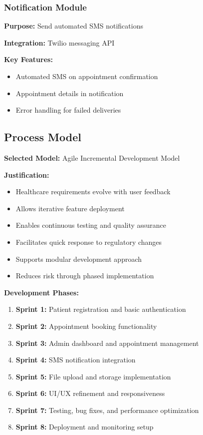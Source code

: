 \documentclass[11pt,a4paper]{article}
\begin{document}
\subsubsection{Notification Module}
\textbf{Purpose:} Send automated SMS notifications

\textbf{Integration:} Twilio messaging API

\textbf{Key Features:}
\begin{itemize}
    \item Automated SMS on appointment confirmation
    \item Appointment details in notification
    \item Error handling for failed deliveries
\end{itemize}

\subsection{Process Model}

\textbf{Selected Model:} Agile Incremental Development Model

\textbf{Justification:}
\begin{itemize}
    \item Healthcare requirements evolve with user feedback
    \item Allows iterative feature deployment
    \item Enables continuous testing and quality assurance
    \item Facilitates quick response to regulatory changes
    \item Supports modular development approach
    \item Reduces risk through phased implementation
\end{itemize}

\textbf{Development Phases:}
\begin{enumerate}
    \item \textbf{Sprint 1:} Patient registration and basic authentication
    \item \textbf{Sprint 2:} Appointment booking functionality
    \item \textbf{Sprint 3:} Admin dashboard and appointment management
    \item \textbf{Sprint 4:} SMS notification integration
    \item \textbf{Sprint 5:} File upload and storage implementation
    \item \textbf{Sprint 6:} UI/UX refinement and responsiveness
    \item \textbf{Sprint 7:} Testing, bug fixes, and performance optimization
    \item \textbf{Sprint 8:} Deployment and monitoring setup
\end{enumerate}
\end{document}

